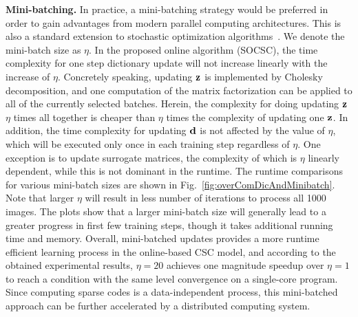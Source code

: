 {\bfseries Mini-batching.} In practice, a mini-batching strategy would be preferred in order to gain advantages from modern parallel computing architectures. This is also a standard extension to stochastic optimization algorithms~\cite{Takac2013, PCDM, SCSG}. We denote the mini-batch size as $\eta$. In the proposed online algorithm (SOCSC), the time complexity for one step dictionary update will not increase linearly with the increase of $\eta$. Concretely speaking, updating $\code$ is implemented by Cholesky decomposition, and one computation of the matrix factorization can be applied to all of the currently selected batches. Herein, the complexity for doing updating $\code$ $\eta$ times all together is cheaper than $\eta$ times the complexity of updating one $\code$. In addition, the time complexity for updating $\filter$ is not affected by the value of $\eta$, which will be executed only once in each training step regardless of $\eta$. One exception is to update surrogate matrices, the complexity of which is $\eta$ linearly dependent, while this is not dominant in the runtime. The runtime comparisons for various mini-batch sizes are shown in Fig.\ \ref{fig:overComDicAndMinibatch}. Note that larger $\eta$ will result in less number of iterations to process all 1000 images. The plots show that a larger mini-batch size will generally lead to a greater progress in first few training steps, though it takes additional running time and memory. Overall, mini-batched updates provides a more runtime efficient learning process in the online-based CSC model, and according to the obtained experimental results, $\eta=20$ achieves one magnitude speedup over $\eta=1$ to reach a condition with the same level convergence on a single-core program. Since computing sparse codes is a data-independent process, this mini-batched approach can be further accelerated by a distributed computing system.